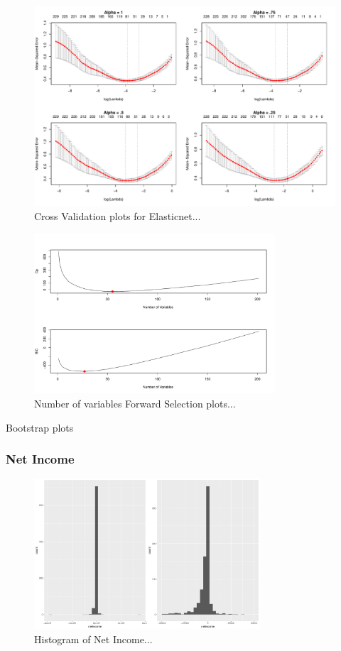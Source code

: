 \documentclass{article}
\begin{document}
\begin{figure}
\includegraphics[width = \textwidth]{elastic_cv_production.pdf}
\caption{Cross Validation plots for Elasticnet...}
\end{figure}

\begin{figure}
\centering
\includegraphics[width = 0.8\textwidth]{forward_nvars_production.pdf}
\caption{Number of variables Forward Selection plots...}
\end{figure}

Bootstrap plots

\subsubsection{Net Income}

\begin{figure}[h]
\centering
\includegraphics[width = 0.75\textwidth]{netincome_histograms.pdf}
\caption{Histogram of Net Income...}
\end{figure}
\end{document}
